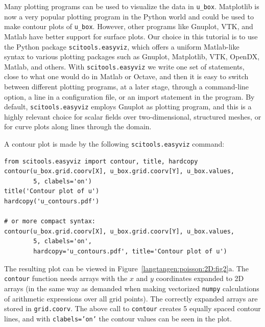 Many plotting programs can be used to visualize the data in
{\fontsize{12pt}{12pt}\verb!u_box!}.  Matplotlib is now a very popular plotting program in
the Python world and could be used to make contour plots of
{\fontsize{12pt}{12pt}\verb!u_box!}. However, other programs like Gnuplot, VTK, and Matlab have better
support for surface plots. Our choice in this tutorial is to use the
Python package {\fontsize{12pt}{12pt}\texttt{scitools.easyviz}}, which offers a uniform
Matlab-like syntax to various plotting packages such as Gnuplot,
Matplotlib, VTK, OpenDX, Matlab, and others. With {\fontsize{12pt}{12pt}\texttt{scitools.easyviz}} we
write one set of statements, close to what one would do in Matlab or
Octave, and then it is easy to switch between different plotting
programs, at a later stage, through a command-line option, a line in a
configuration file, or an import statement in the program.  By
default, {\fontsize{12pt}{12pt}\texttt{scitools.easyviz}} employs Gnuplot as plotting program,
and this is a highly relevant choice for scalar fields over two-dimensional,
structured meshes, or for curve plots along lines through the domain.

A contour plot is made by the following {\fontsize{12pt}{12pt}\texttt{scitools.easyviz}} command:
\begin{Verbatim}[fontsize=\fontsize{10pt}{10pt},tabsize=8,baselinestretch=1.05,
fontfamily=tt,xleftmargin=7mm]
from scitools.easyviz import contour, title, hardcopy
contour(u_box.grid.coorv[X], u_box.grid.coorv[Y], u_box.values,
        5, clabels='on')
title('Contour plot of u')
hardcopy('u_contours.pdf')

# or more compact syntax:
contour(u_box.grid.coorv[X], u_box.grid.coorv[Y], u_box.values,
        5, clabels='on',
        hardcopy='u_contours.pdf', title='Contour plot of u')
\end{Verbatim}
\noindent
The resulting plot can be viewed in Figure~\ref{langtangen:poisson:2D:fig2}a.
The {\fontsize{12pt}{12pt}\texttt{contour}} function needs arrays with the $x$ and $y$ coordinates
expanded to 2D arrays (in the same way as demanded when
making vectorized
{\fontsize{12pt}{12pt}\texttt{numpy}} calculations of arithmetic expressions over all grid points).
The correctly expanded arrays are stored in {\fontsize{12pt}{12pt}\texttt{grid.coorv}}.
The above call to
{\fontsize{12pt}{12pt}\texttt{contour}} creates 5 equally spaced contour lines, and with
{\fontsize{12pt}{12pt}\texttt{clabels='on'}} the contour values can be seen in the plot.

